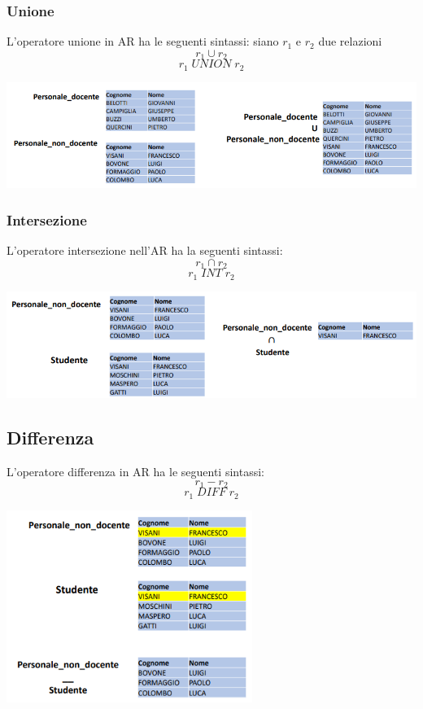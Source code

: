 \documentclass[12pt]{article}
\begin{document}
\subsubsection{Unione}
L'operatore unione in AR ha le seguenti sintassi: siano $r_1$ e $r_2$ due relazioni
$$r_1 \cup r_2$$
$$r_1 \; UNION \; r_2$$
\begin{center}
    \includegraphics[width = 1\textwidth]{Images/125.PNG}
\end{center}
\subsubsection{Intersezione}
L'operatore intersezione nell'AR ha la seguenti sintassi:
$$r_1 \cap r_2$$
$$r_1 \; INT \; r_2$$
\begin{center}
    \includegraphics[width = 1\textwidth]{Images/126.PNG}
\end{center}
\subsection{Differenza}
L'operatore differenza in AR ha le seguenti sintassi:
$$r_1 - r_2$$
$$r_1 \; DIFF \; r_2$$
\begin{center}
    \includegraphics[width = 0.60\textwidth]{Images/127.PNG}
\end{center}
\end{document}
